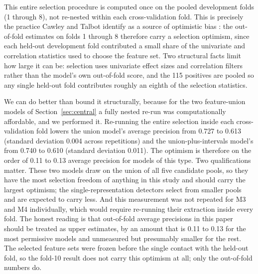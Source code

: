 \documentclass[11pt]{article}
\begin{document}
This entire selection procedure is computed once on the pooled development folds (1 through 8), not re-nested within each cross-validation fold. This is precisely the practice Cawley and Talbot identify as a source of optimistic bias \cite{cawley}: the out-of-fold estimates on folds 1 through 8 therefore carry a selection optimism, since each held-out development fold contributed a small share of the univariate and correlation statistics used to choose the feature set. Two structural facts limit how large it can be: selection uses univariate effect sizes and correlation filters rather than the model's own out-of-fold score, and the 115 positives are pooled so any single held-out fold contributes roughly an eighth of the selection statistics.

We can do better than bound it structurally, because for the two feature-union models of Section~\ref{sec:central} a fully nested re-run was computationally affordable, and we performed it. Re-running the entire selection inside each cross-validation fold lowers the union model's average precision from 0.727 to 0.613 (standard deviation 0.004 across repetitions) and the union-plus-intervals model's from 0.740 to 0.610 (standard deviation 0.011). The optimism is therefore on the order of 0.11 to 0.13 average precision for models of this type. Two qualifications matter. These two models draw on the union of all five candidate pools, so they have the most selection freedom of anything in this study and should carry the largest optimism; the single-representation detectors select from smaller pools and are expected to carry less. And this measurement was not repeated for M3 and M4 individually, which would require re-running their extraction inside every fold. The honest reading is that out-of-fold average precisions in this paper should be treated as upper estimates, by an amount that is 0.11 to 0.13 for the most permissive models and unmeasured but presumably smaller for the rest. The selected feature sets were frozen before the single contact with the held-out fold, so the fold-10 result does not carry this optimism at all; only the out-of-fold numbers do.
\end{document}
